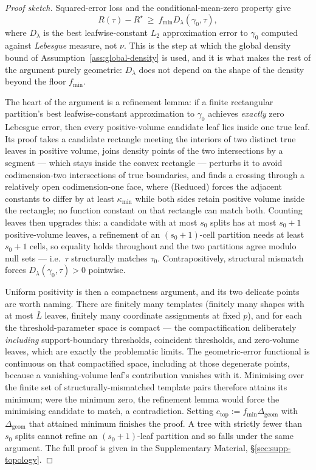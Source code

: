 \documentclass[11pt]{article}
\theoremstyle{plain}
\theoremstyle{definition}
\theoremstyle{remark}
\begin{document}
\begin{proof}[Proof sketch]
Squared-error loss and the conditional-mean-zero property give
\[
  R(\tau)-R^\star\ \ge\ f_{\min}D_\lambda(\gamma_0,\tau),
\]
where
\(D_\lambda\) is the best leafwise-constant \(L_2\) approximation error to
\(\gamma_0\) computed against \emph{Lebesgue} measure, not \(\nu\). This is
the step at which the global density bound of
Assumption~\ref{ass:global-density} is used, and it is what makes the rest of
the argument purely geometric: \(D_\lambda\) does not depend on the shape of
the density beyond the floor \(f_{\min}\).

The heart of the argument is a refinement lemma: if a finite rectangular
partition's best leafwise-constant approximation to \(\gamma_0\) achieves
\emph{exactly} zero Lebesgue error, then every positive-volume candidate leaf
lies inside one true leaf. Its proof takes a candidate rectangle meeting the
interiors of two distinct true leaves in positive volume, joins density points
of the two intersections by a segment --- which stays inside the convex
rectangle --- perturbs it to avoid codimension-two intersections of true
boundaries, and finds a crossing through a relatively open codimension-one
face, where (Reduced) forces the adjacent constants to differ by at least
\(\kappa_{\min}\) while both sides retain positive volume inside the
rectangle; no function constant on that rectangle can match both. Counting
leaves then upgrades this: a candidate with at most \(s_0\) splits has at most
\(s_0+1\) positive-volume leaves, a refinement of an \((s_0+1)\)-cell
partition needs at least \(s_0+1\) cells, so equality holds throughout and the
two partitions agree modulo null sets --- i.e.\ \(\tau\) structurally matches
\(\tau_0\). Contrapositively, structural mismatch forces
\(D_\lambda(\gamma_0,\tau)>0\) pointwise.

Uniform positivity is then a compactness argument, and its two delicate
points are worth naming. There are finitely many templates (finitely many
shapes with at most \(\bar L\) leaves, finitely many coordinate assignments at
fixed \(p\)), and for each the threshold-parameter space is compact --- the
compactification deliberately \emph{including} support-boundary thresholds,
coincident thresholds, and zero-volume leaves, which are exactly the
problematic limits. The geometric-error functional is continuous on that
compactified space, including at those degenerate points, because a
vanishing-volume leaf's contribution vanishes with it. Minimising over the
finite set of structurally-mismatched template pairs therefore attains its
minimum; were the minimum zero, the refinement lemma would force the
minimising candidate to match, a contradiction. Setting
\(c_{\mathrm{top}}:=f_{\min}\Delta_{\mathrm{geom}}\) with
\(\Delta_{\mathrm{geom}}\) that attained minimum finishes the proof. A tree
with strictly fewer than \(s_0\) splits cannot refine an \((s_0+1)\)-leaf
partition and so falls under the same argument. The full proof is given in the
Supplementary Material, \S\ref{sec:supp-topology}.
\end{proof}
\end{document}
